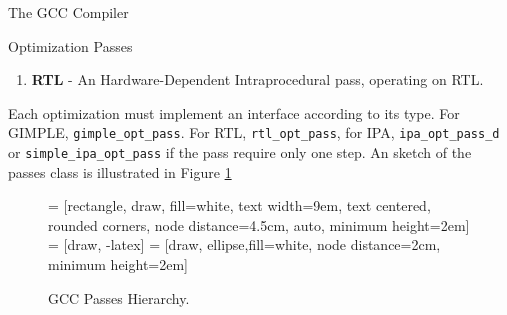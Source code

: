 \begin{section}{The GCC Compiler}
\begin{subsection}{Optimization Passes}
\begin{enumerate}
        \item \textbf{RTL} - An Hardware-Dependent Intraprocedural pass, operating
		on RTL.
    \end{enumerate}

	Each optimization must implement an interface according to its type.
	For GIMPLE, \texttt{gimple\_opt\_pass}. For RTL, \texttt{rtl\_opt\_pass},
	for IPA, \texttt{ipa\_opt\_pass\_d} or \texttt{simple\_ipa\_opt\_pass} if the pass
	require only one step. An sketch of the passes class is illustrated in Figure \ref{fig:opt_uml}

\begin{figure}
 = [rectangle, draw, fill=white,
    text width=9em, text centered, rounded corners, node distance=4.5cm, auto, minimum height=2em]
 = [draw, -latex]
 = [draw, ellipse,fill=white, node distance=2cm,
    minimum height=2em]
\begin{center}
\end{center}
\caption{GCC Passes Hierarchy.}
\label{fig:opt_uml}
\end{figure}


\end{subsection}


\end{section}
